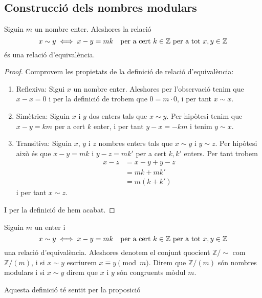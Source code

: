 \documentclass[../../Main.tex]{subfiles}
\begin{document}
	\subsection{Construcció dels nombres modulars}
	\begin{proposition}
		\label{prop:relació d'equivalència Z/(m)}
		Siguin \(m\) un nombre enter. Aleshores la relació
		\[x\sim y\iff x-y=mk\quad\text{per a cert }k\in\mathbb{Z}\text{ per a tot }x,y\in\mathbb{Z}\]
		és una relació d'equivalència.
		\begin{proof}
			Comprovem les propietats de la definició de relació d'equivalència:
			\begin{enumerate}
				\item Reflexiva: Sigui \(x\) un nombre enter. Aleshores per l'observació  tenim que \(x-x=0\) i per la definició de  trobem que \(0=m\cdot 0\), i per tant \(x\sim x\).
				\item Simètrica: Siguin \(x\) i \(y\) dos enters tals que \(x\sim y\). Per hipòtesi tenim que \(x-y=km\) per a cert \(k\) enter, i per tant \(y-x=-km\) i tenim \(y\sim x\).
				\item Transitiva: Siguin \(x\), \(y\) i \(z\) nombres enters tals que \(x\sim y\) i \(y\sim z\). Per hipòtesi això és que \(x-y=mk\) i \(y-z=mk'\) per a cert \(k,k'\) enters. Per tant trobem
				\begin{align*}
				x-z&=x-y+y-z\\
				&=mk+mk'\\
				&=m(k+k')
				\end{align*}
				i per tant \(x\sim z\).
			\end{enumerate}
			I per la definició de  hem acabat.
		\end{proof}
	\end{proposition}
	\begin{definition}
		\label{def:nombres modulars}\label{def:Z/(m)}
		\label{def:nombres modulars congruents}
		Siguin \(m\) un enter i
		\[x\sim y\iff x-y=mk\quad\text{per a cert }k\in\mathbb{Z}\text{ per a tot }x,y\in\mathbb{Z}\]
		una relació d'equivalència. Aleshores denotem el conjunt quocient \(\mathbb{Z}/\sim\) com \(\mathbb{Z}/(m)\), i si \(x\sim y\) escriurem \(x\equiv y\pmod{m}\). Direm que \(\mathbb{Z}/(m)\) són nombres modulars i si \(x\sim y\) direm que \(x\) i \(y\) són congruents mòdul \(m\).
		
		Aquesta definició té sentit per la proposició 
	\end{definition}
\end{document}
